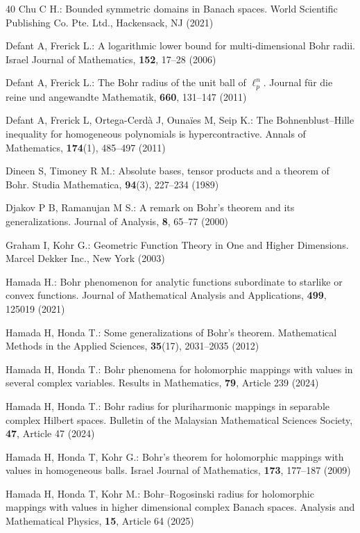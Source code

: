 \documentclass{birkjour}
\theoremstyle{plain}
\theoremstyle{definition}
\theoremstyle{definition}
\begin{document}
\begin{thebibliography}{40}
	Chu C H.: Bounded symmetric domains in Banach spaces. World Scientific Publishing Co. Pte. Ltd., Hackensack, NJ (2021)
	
	Defant A, Frerick L.: A logarithmic lower bound for multi-dimensional Bohr radii. Israel Journal of Mathematics, \textbf{152}, 17--28 (2006)
	
	Defant A, Frerick L.: The Bohr radius of the unit ball of $\ell_p^n$. Journal für die reine und angewandte Mathematik, \textbf{660}, 131--147 (2011)
	
	Defant A, Frerick L, Ortega-Cerdà J, Ounaïes M, Seip K.: The Bohnenblust–Hille inequality for homogeneous polynomials is hypercontractive. Annals of Mathematics, \textbf{174}(1), 485--497 (2011)
	
	Dineen S, Timoney R M.: Absolute bases, tensor products and a theorem of Bohr. Studia Mathematica, \textbf{94}(3), 227--234 (1989)
	
	Djakov P B, Ramanujan M S.: A remark on Bohr’s theorem and its generalizations. Journal of Analysis, \textbf{8}, 65--77 (2000)
	
	Graham I, Kohr G.: Geometric Function Theory in One and Higher Dimensions. Marcel Dekker Inc., New York (2003)
	
	Hamada H.: Bohr phenomenon for analytic functions subordinate to starlike or convex functions. Journal of Mathematical Analysis and Applications, \textbf{499}, 125019 (2021)
	
	Hamada H, Honda T.: Some generalizations of Bohr's theorem. Mathematical Methods in the Applied Sciences, \textbf{35}(17), 2031--2035 (2012)
	
	Hamada H, Honda T.: Bohr phenomena for holomorphic mappings with values in several complex variables. Results in Mathematics, \textbf{79}, Article 239 (2024)
	
	Hamada H, Honda T.: Bohr radius for pluriharmonic mappings in separable complex Hilbert spaces. Bulletin of the Malaysian Mathematical Sciences Society, \textbf{47}, Article 47 (2024)
	
	Hamada H, Honda T, Kohr G.: Bohr's theorem for holomorphic mappings with values in homogeneous balls. Israel Journal of Mathematics, \textbf{173}, 177--187 (2009)
	
	Hamada H, Honda T, Kohr M.: Bohr–Rogosinski radius for holomorphic mappings with values in higher dimensional complex Banach spaces. Analysis and Mathematical Physics, \textbf{15}, Article 64 (2025)
	

\end{thebibliography}
\end{document}
